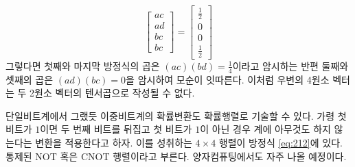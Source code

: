 \documentclass[a4paper,chapter,atbegshi,]{oblivoir}
\begin{document}
\begin{equation}
  \begin{bmatrix}ac\\ad\\bc\\bc\end{bmatrix} = 
  \begin{bmatrix}\frac{1}{2}\\0\\0\\\frac{1}{2}\end{bmatrix}
\end{equation}
그렇다면 첫째와 마지막 방정식의 곱은 $(ac)(bd)=\frac{1}{4}$이라고 암시하는
반편 둘째와 셋째의 곱은 $(ad)(bc)=0$을 암시하여 모순이 잇따른다. 
이처럼 우변의 4원소 벡터는 두 2원소 벡터의 텐서곱으로 작성될 수 없다.

단일비트계에서 그랬듯 이중비트계의 확률변환도 확률행렬로 기술할 수 있다.
가령 첫 비트가 $1$이면 두 번째 비트를 뒤집고 첫 비트가 $1$이 아닌 경우
계에 아무것도 하지 않는다는 변환을 적용한다고 하자. 이를 성취하는
$4\times4$ 행렬이 방정식 \ref{eq:212}에 있다. 통제된 NOT 혹은 CNOT 행렬이라고
부른다. 양자컴퓨팅에서도 자주 나올 예정이다.  
\end{document}
